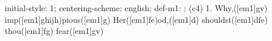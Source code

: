 initial-style: 1;
centering-scheme: english;
def-m1: \grealign;
(c4) 1. Why,([em1]gv) imp([em1]ghijh)pious([em1]g) Her([em1]fe)od,([em1]d) shouldst([em1]dfe) thou([em1]fg) fear([em1]gv)
